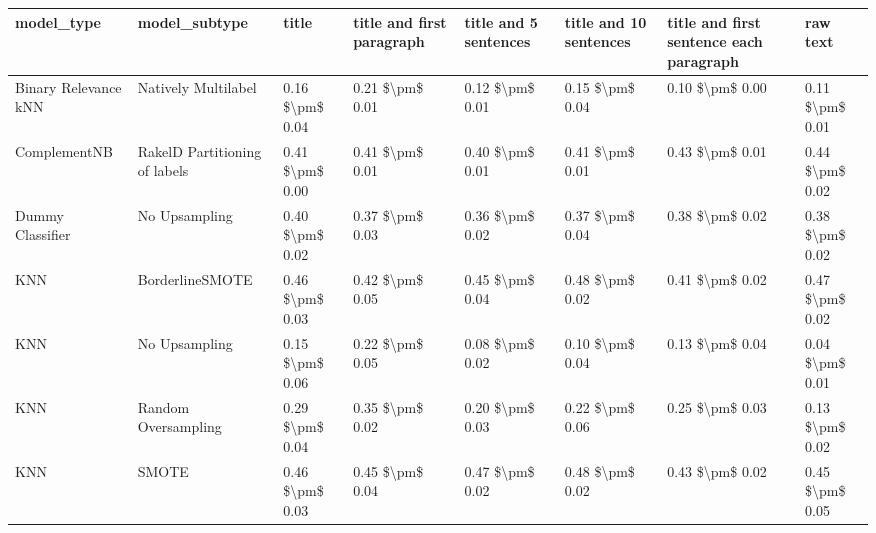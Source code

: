 \begin{tabular}{llllllll}
\toprule
                     model\_type &                 model\_subtype &           title & title and first paragraph & title and 5 sentences & title and 10 sentences & title and first sentence each paragraph &            raw text \\
\midrule
           Binary Relevance kNN &           Natively Multilabel & 0.16 \$\textbackslash pm\$ 0.04 &           0.21 \$\textbackslash pm\$ 0.01 &       0.12 \$\textbackslash pm\$ 0.01 &        0.15 \$\textbackslash pm\$ 0.04 &                         0.10 \$\textbackslash pm\$ 0.00 &     0.11 \$\textbackslash pm\$ 0.01 \\
                   ComplementNB & RakelD Partitioning of labels & 0.41 \$\textbackslash pm\$ 0.00 &           0.41 \$\textbackslash pm\$ 0.01 &       0.40 \$\textbackslash pm\$ 0.01 &        0.41 \$\textbackslash pm\$ 0.01 &                         0.43 \$\textbackslash pm\$ 0.01 &     0.44 \$\textbackslash pm\$ 0.02 \\
               Dummy Classifier &                 No Upsampling & 0.40 \$\textbackslash pm\$ 0.02 &           0.37 \$\textbackslash pm\$ 0.03 &       0.36 \$\textbackslash pm\$ 0.02 &        0.37 \$\textbackslash pm\$ 0.04 &                         0.38 \$\textbackslash pm\$ 0.02 &     0.38 \$\textbackslash pm\$ 0.02 \\
                            KNN &               BorderlineSMOTE & 0.46 \$\textbackslash pm\$ 0.03 &           0.42 \$\textbackslash pm\$ 0.05 &       0.45 \$\textbackslash pm\$ 0.04 &        0.48 \$\textbackslash pm\$ 0.02 &                         0.41 \$\textbackslash pm\$ 0.02 &     0.47 \$\textbackslash pm\$ 0.02 \\
                            KNN &                 No Upsampling & 0.15 \$\textbackslash pm\$ 0.06 &           0.22 \$\textbackslash pm\$ 0.05 &       0.08 \$\textbackslash pm\$ 0.02 &        0.10 \$\textbackslash pm\$ 0.04 &                         0.13 \$\textbackslash pm\$ 0.04 &     0.04 \$\textbackslash pm\$ 0.01 \\
                            KNN &           Random Oversampling & 0.29 \$\textbackslash pm\$ 0.04 &           0.35 \$\textbackslash pm\$ 0.02 &       0.20 \$\textbackslash pm\$ 0.03 &        0.22 \$\textbackslash pm\$ 0.06 &                         0.25 \$\textbackslash pm\$ 0.03 &     0.13 \$\textbackslash pm\$ 0.02 \\
                            KNN &                         SMOTE & 0.46 \$\textbackslash pm\$ 0.03 &           0.45 \$\textbackslash pm\$ 0.04 &       0.47 \$\textbackslash pm\$ 0.02 &        0.48 \$\textbackslash pm\$ 0.02 &                         0.43 \$\textbackslash pm\$ 0.02 &     0.45 \$\textbackslash pm\$ 0.05 \\

\end{tabular}
